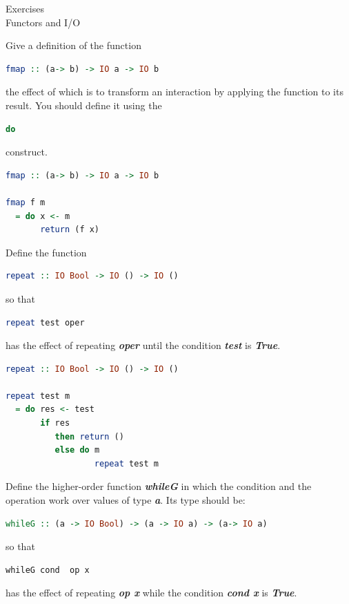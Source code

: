 \documentclass{article}
\newcommand\ExTitle{Functors and I/O}
\newcommand\fullExTitle{Exercises \\ \ExTitle }
\begin{document}
\begin{Huge}
	\begin{center}
	\fullExTitle
	\end{center}
\end{Huge}

\begin{exercise}
Give a definition of the function 
\begin{lstlisting}[language=Haskell]
fmap :: (a-> b) -> IO a -> IO b
  \end{lstlisting}
the effect of which is to transform an interaction by applying the function to its result. You should define it using the 
\begin{lstlisting}[language=Haskell]
do  
\end{lstlisting}
construct.
\end{exercise}


\begin{solution}
\begin{lstlisting}[language=Haskell]
fmap :: (a-> b) -> IO a -> IO b

fmap f m
  = do x <- m
       return (f x)
  \end{lstlisting}
\end{solution}


\begin{exercise} 
Define the function 
\begin{lstlisting}[language=Haskell]
repeat :: IO Bool -> IO () -> IO ()
  \end{lstlisting}
 so that 
 \begin{lstlisting}[language=Haskell]
repeat test oper
  \end{lstlisting}
has the effect of repeating \textit{\textbf{oper}}  until the condition \textit{\textbf{test}} is \textit{\textbf{True}}.
\end{exercise}


\begin{solution}
\begin{lstlisting}[language=Haskell]
repeat :: IO Bool -> IO () -> IO ()

repeat test m
  = do res <- test
       if res 
          then return ()
          else do m
                  repeat test m
 \end{lstlisting}
 \end{solution}


\begin{exercise}
Define the higher-order function \textit{\textbf{whileG}} in which the condition and the operation work over values of type \textit{\textbf{a}}. Its type should be:
\begin{lstlisting}[language=Haskell]
whileG :: (a -> IO Bool) -> (a -> IO a) -> (a-> IO a) 
\end{lstlisting}
so that 
 \begin{lstlisting}[language=Haskell]
whileG cond  op x
  \end{lstlisting}
has the effect of repeating \textit{\textbf{op x}}  while the condition \textit{\textbf{cond x }} is \textit{\textbf{True}}.

\end{exercise} 
\end{document}
